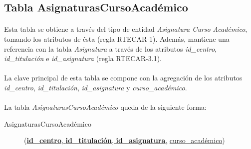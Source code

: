    \subsection{Tabla AsignaturasCursoAcadémico}

      \paragraph{}Esta tabla se obtiene a través del tipo de entidad
      \textit{Asignatura Curso Académico}, tomando los atributos de ésta
      (regla RTECAR-1). Además, mantiene una referencia con la tabla
      \textit{Asignatura} a través de los atributos \textit{id\_centro},
      \textit{id\_titulación} e \textit{id\_asignatura} (regla
      RTECAR-3.1).

      \paragraph{}La clave principal de esta tabla se compone con la agregación
      de los atributos \textit{id\_centro}, \textit{id\_titulación},
      \textit{id\_asignatura} y \textit{curso\_académico}.

      \paragraph{}La tabla \textit{AsignaturasCursoAcadémico} queda de la
      siguiente forma:

      \begin{description}
         \item[AsignaturasCursoAcadémico] \begin{flushleft}(\underline{\textbf{id\_centro},
         \textbf{id\_titulación}, \textbf{id\_asignatura},} \underline{curso\_académico})
         \end{flushleft}
      \end{description}

